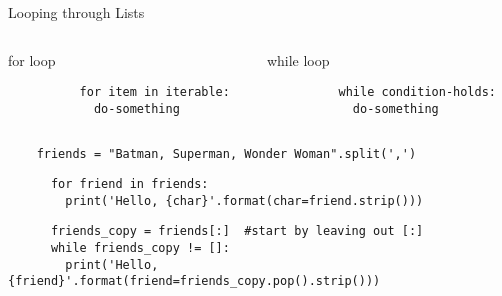 \begin{frame}[fragile]{Looping through Lists}
  \begin{columns}[T]
    \begin{column}{0.48\textwidth}
      \begin{block}{for loop}
        \begin{verbatim}
          for item in iterable:
            do-something
        \end{verbatim}
      \end{block}
    \end{column}
    \hfill

    \begin{column}{0.48\textwidth}
      \begin{block}{while loop}
        \begin{verbatim}
          while condition-holds:
            do-something
        \end{verbatim}
      \end{block}
    \end{column}
  \end{columns}

  \begin{verbatim}
    friends = "Batman, Superman, Wonder Woman".split(',')
  \end{verbatim}

  \begin{verbatim}
      for friend in friends:
        print('Hello, {char}'.format(char=friend.strip()))
  \end{verbatim}

  \begin{verbatim}
      friends_copy = friends[:]  #start by leaving out [:]
      while friends_copy != []:
        print('Hello, {friend}'.format(friend=friends_copy.pop().strip()))
  \end{verbatim}
\end{frame}
